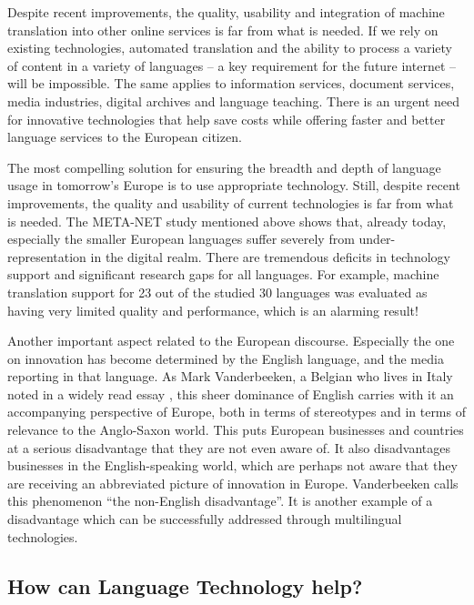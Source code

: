 \documentclass[10pt, plain]{../../metanetpaper}
\begin{document}
\begin{multicols}{2}
Despite recent improvements, the quality, usability and integration of machine translation into other online services is far from what is needed. If we rely on existing technologies, automated translation and the ability to process a variety of content in a variety of languages -- a key requirement for the future internet -- will be impossible. The same applies to information services, document services, media industries, digital archives and language teaching. There is an urgent need for innovative technologies that help save costs while offering faster and better language services to the European citizen.

The most compelling solution for ensuring the breadth and depth of language usage in tomorrow's Europe is to use appropriate technology. Still, despite recent improvements, the quality and usability of current technologies is far from what is needed. The META-NET study mentioned above shows that, already today, especially the smaller European languages suffer severely from under-representation in the digital realm. There are tremendous deficits in technology support and significant research gaps for all languages. For example, machine translation support for 23 out of the studied 30 languages was evaluated as having very limited quality and performance, which is an alarming result!

Another important aspect related to the European discourse. Especially the one on innovation has become determined by the English language, and the media reporting in that language. As Mark Vanderbeeken, a Belgian who lives in Italy noted in a widely read essay \cite{vanderbeeken2012}, this sheer dominance of English carries with it an accompanying perspective of Europe, both in terms of stereotypes and in terms of relevance to the Anglo-Saxon world. This puts European businesses and countries at a serious disadvantage that they are not even aware of. It also disadvantages businesses in the English-speaking world, which are perhaps not aware that they are receiving an abbreviated picture of innovation in Europe. Vanderbeeken calls this phenomenon ``the non-English disadvantage''. It is another example of a disadvantage which can be successfully addressed through multilingual technologies.

\subsection{How can Language Technology help?}
\label{sec:how-can-language-technology-help}


\end{multicols}
\end{document}
